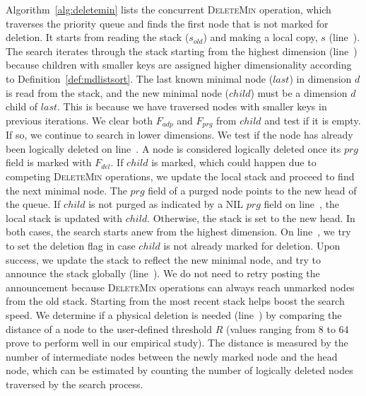 \documentclass[10pt,journal,letterpaper,compsoc]{IEEEtran}
\begin{document}
Algorithm~\ref{alg:deletemin} lists the concurrent \textsc{DeleteMin} operation, which traverses the priority queue and finds the first node that is not marked for deletion.
It starts from reading the stack ($s_{old}$) and making a local copy, $s$ (line~).
The search iterates through the stack starting from the highest dimension (line~) because children with smaller keys are assigned higher dimensionality according to Definition~\ref{def:mdlistsort}.
The last known minimal node ($last$) in dimension $d$ is read from the stack, and the new minimal node ($child$) must be a dimension $d$ child of $last$.
This is because we have traversed nodes with smaller keys in previous iterations.
We clear both $F_{adp}$ and $F_{prg}$ from $child$ and test if it is empty.
If so, we continue to search in lower dimensions.
We test if the node has already been logically deleted on line~.
A node is considered logically deleted once its $prg$ field is marked with $F_{del}$.
If $child$ is marked, which could happen due to competing \textsc{DeleteMin} operations, we update the local stack and proceed to find the next minimal node.
The $prg$ field of a purged node points to the new head of the queue.
If $child$ is not purged as indicated by a NIL $prg$ field on line~, the local stack is updated with $child$.
Otherwise, the stack is set to the new head. 
In both cases, the search starts anew from the highest dimension.
On line~, we try to set the deletion flag in case $child$ is not already marked for deletion.
Upon success, we update the stack to reflect the new minimal node, and try to announce the stack globally (line~). 
We do not need to retry posting the announcement because \textsc{DeleteMin} operations can always reach unmarked nodes from the old stack. Starting from the most recent stack helps boost the search speed. 
We determine if a physical deletion is needed (line~) by comparing the distance of a node to the user-defined threshold $R$ (values ranging from 8 to 64 prove to perform well in our empirical study).
The distance is measured by the number of intermediate nodes between the newly marked node and the head node, which can be estimated by counting the number of logically deleted nodes traversed by the search process. 
\end{document}
